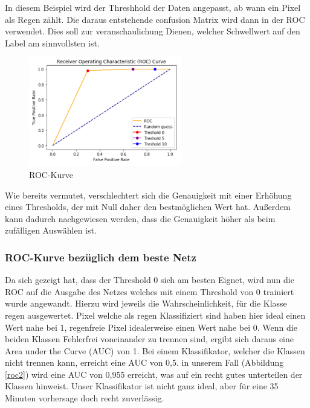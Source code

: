 In diesem Beispiel wird der Threshhold der Daten angepasst, ab wann ein Pixel als Regen zählt. Die daraus entstehende confusion Matrix wird dann in der ROC verwendet. Dies soll zur veranschaulichung Dienen, welcher Schwellwert auf den Label am sinnvollsten ist.

\begin{figure}[H]
	\centering
	\includegraphics[width=0.6\textwidth]{pics/roc.PNG}
	\caption{ROC-Kurve}
	\label{roc}
\end{figure}

Wie bereits vermutet, verschlechtert sich die Genauigkeit mit einer Erhöhung eines Thresholds, der mit Null daher den bestmöglichen Wert hat.
Außerdem kann dadurch nachgewiesen werden, dass die Genauigkeit höher als beim zufälligen Auswählen ist.

\subsubsection{ROC-Kurve bezüglich dem beste Netz}

Da sich gezeigt hat, dass der Threshold 0 sich am besten Eignet, wird nun die ROC auf die Ausgabe des Netzes welches mit einem Threshold von 0 trainiert wurde angewandt. Hierzu wird jeweils die Wahrscheinlichkeit, für die Klasse regen ausgewertet. Pixel welche als regen Klassifiziert sind haben hier ideal einen Wert nahe bei 1, regenfreie Pixel idealerweise einen Wert nahe bei 0. Wenn die beiden Klassen Fehlerfrei voneinander zu trennen sind, ergibt sich daraus eine Area under the Curve (AUC) von 1. Bei einem Klassifikator, welcher die Klassen nicht trennen kann, erreicht eine AUC von 0,5. in unserem Fall (Abbildung \ref{roc2}) wird eine AUC von 0,955 erreicht, was auf ein recht gutes unterteilen der Klassen hinweist. Unser Klassifikator ist nicht ganz ideal, aber für eine 35 Minuten vorhersage doch recht zuverlässig.

